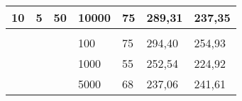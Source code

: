 \documentclass{article}
\begin{document}
\begin{table}[h]
\begin{tabular}{lllllll}
			\multicolumn{1}{|l|}{\multirow{-4}{*}{10}}                             & \multicolumn{1}{l|}{\multirow{-4}{*}{5}}       & \multicolumn{1}{l|}{\multirow{-4}{*}{50}}                             & \multicolumn{1}{l|}{10000}                                                & \multicolumn{1}{l|}{75}                                                      & \multicolumn{1}{l|}{289,31}                                                         & \multicolumn{1}{l|}{237,35}                                                           \\ \hline
			&                                                &                                                                       &                                                                           &                                                                              &                                                                                     &                                                                                       \\ \hline
			\multicolumn{1}{|l|}{}                                                 & \multicolumn{1}{l|}{}                          & \multicolumn{1}{l|}{}                                                 & \multicolumn{1}{l|}{100}                                                  & \multicolumn{1}{l|}{75}                                                      & \multicolumn{1}{l|}{294,40}                                                         & \multicolumn{1}{l|}{254,93}                                                           \\ \cline{4-7} 
			\multicolumn{1}{|l|}{}                                                 & \multicolumn{1}{l|}{}                          & \multicolumn{1}{l|}{}                                                 & \multicolumn{1}{l|}{1000}                                                 & \multicolumn{1}{l|}{55}                                                      & \multicolumn{1}{l|}{252,54}                                                         & \multicolumn{1}{l|}{224,92}                                                           \\ \cline{4-7} 
			\multicolumn{1}{|l|}{}                                                 & \multicolumn{1}{l|}{}                          & \multicolumn{1}{l|}{}                                                 & \multicolumn{1}{l|}{5000}                                                 & \multicolumn{1}{l|}{68}                                                      & \multicolumn{1}{l|}{237,06}                                                         & \multicolumn{1}{l|}{241,61}                                                           \\ \cline{4-7} 

\end{tabular}
\end{table}
\end{document}
